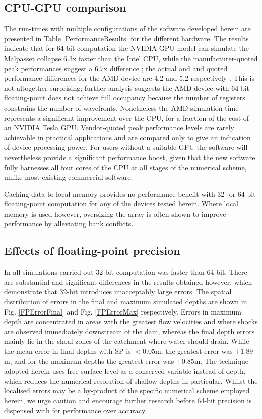 \documentclass[11pt,english,a4paper]{article}
\begin{document}
\subsection{CPU-GPU comparison}

The run-times with multiple configurations of the software developed herein are presented in Table \ref{PerformanceResults} for the different hardware. The results indicate that for 64-bit computation the NVIDIA GPU model can simulate the Malpasset collapse 6.3x faster than the Intel CPU, while the manufacturer-quoted peak performances suggest a 6.7x difference \cite{NVIDIA_11,Intel_12}; the actual and and quoted performance differences for the AMD device are 4.2 and 5.2 respectively \cite{AMD_12}. This is not altogether surprising; further analysis suggests the AMD device with 64-bit floating-point does not achieve full occupancy because the number of registers constrains the number of wavefronts. Nonetheless the AMD simulation time represents a significant improvement over the CPU, for a fraction of the cost of an NVIDIA Tesla GPU. Vendor-quoted peak performance levels are rarely achievable in practical applications and are compared only to give an indication of device processing power. For users without a suitable GPU the software will nevertheless provide a significant performance boost, given that the new software fully harnesses all four cores of the CPU at all stages of the numerical scheme, unlike most existing commercial software.

Caching data to local memory provides no performance benefit with 32- or 64-bit floating-point computation for any of the devices tested herein. Where local memory is used however, oversizing the array is often shown to improve performance by alleviating bank conflicts. 

\subsection{Effects of floating-point precision}

In all simulations carried out 32-bit computation was faster than 64-bit. There are substantial and significant differences in the results obtained however, which demonstrate that 32-bit introduces unacceptably large errors. The spatial distribution of errors in the final and maximum simulated depths are shown in Fig. \ref{FPErrorFinal} and Fig. \ref{FPErrorMax} respectively.  Errors in maximum depth are concentrated in areas with the greatest flow velocities and where shocks are observed immediately downstream of the dam, whereas the final depth errors mainly lie in the shoal zones of the catchment where water should drain. While the mean error in final depths with SP is \(<0.05\)m, the greatest error was \(+1.89\)m, and for the maximum depths the greatest error was \(+0.85\)m. The technique adopted herein uses free-surface level as a conserved variable instead of depth, which reduces the numerical resolution of shallow depths in particular. Whilst the localised errors may be a by-product of the specific numerical scheme employed herein, we urge caution and encourage further research before 64-bit precision is dispensed with for performance over accuracy.
\end{document}
